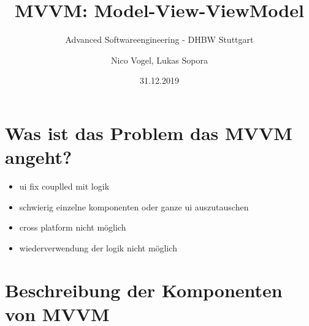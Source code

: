 \documentclass[titlepage=false,12pt]{scrreprt}
\title{MVVM: Model-View-ViewModel}
\subtitle{Advanced Softwareengineering - DHBW Stuttgart}
\author{Nico Vogel, Lukas Sopora}
\date{31.12.2019}
\begin{document}
	\maketitle
	{\renewcommand\clearpage\relax
		\tableofcontents}
	\newpage

	\chapter{Was ist das Problem das MVVM angeht?}
	\begin{itemize}
		\item ui fix couplled mit logik
		\item schwierig einzelne komponenten oder ganze ui auszutauschen
		\item cross platform nicht möglich
		\item wiederverwendung der logik nicht möglich
	\end{itemize}


	\chapter{Beschreibung der Komponenten von MVVM}
\end{document}
